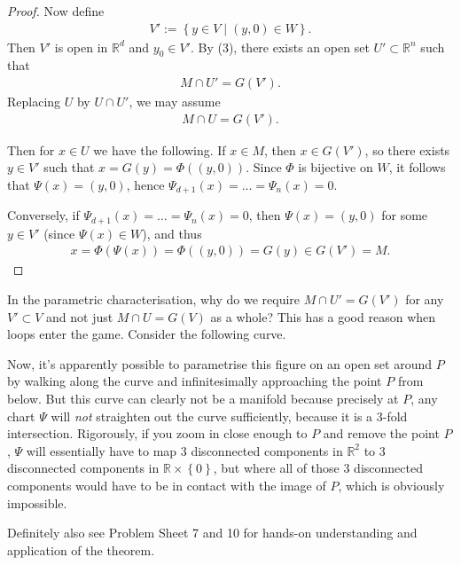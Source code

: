 \begin{proof}
	Now define
	\begin{align*}
		V' := \left\{ y \in V \mid (y,0) \in W \right\}.
	\end{align*}
	Then $V'$ is open in $\mathbb{R}^{d}$ and $y_{0} \in V'$. By (3), there exists an open set $U' \subset \mathbb{R}^{n}$ such that
	\begin{align*}
		M \cap U' = G(V').
	\end{align*}
	Replacing $U$ by $U \cap U'$, we may assume
	\begin{align*}
		M \cap U = G(V').
	\end{align*}

	Then for $x \in U$ we have the following. If $x \in M$, then $x \in G(V')$, so there exists $y \in V'$ such that $x = G(y) = \Phi((y,0))$. Since $\Phi$ is bijective on $W$, it follows that $\Psi(x) = (y,0)$, hence $\Psi_{d+1}(x) = \dots = \Psi_{n}(x) = 0$.

	Conversely, if $\Psi_{d+1}(x) = \dots = \Psi_{n}(x) = 0$, then $\Psi(x) = (y,0)$ for some $y \in V'$ (since $\Psi(x) \in W$), and thus
	\begin{align*}
		x = \Phi(\Psi(x)) = \Phi((y,0)) = G(y) \in G(V') = M.
	\end{align*}
\end{proof}


\begin{remark}
	In the parametric characterisation, why do we require $M \cap U' = G(V')$ for any $V' \subset V$ and not just $M \cap U = G(V)$ as a whole? This has a good reason when loops enter the game. Consider the following curve.
	\begin{center}
		\centering
		\def\svgwidth{0.3\linewidth}
		
	\end{center}
	Now, it's apparently possible to parametrise this figure on an open set around $P$ by walking along the curve and infinitesimally approaching the point $P$ from below. But this curve can clearly not be a manifold because precisely at $P$, any chart $\Psi$ will \textit{not} straighten out the curve sufficiently, because it is a $3$-fold intersection. Rigorously, if you zoom in close enough to $P$ and remove the point $P$, $\Psi$ will essentially have to map $3$ disconnected components in $\mathbb{R}^{2}$ to $3$ disconnected components in $\mathbb{R} \times \left\{ 0 \right\}$, but where all of those $3$ disconnected components would have to be in contact with the image of $P$, which is obviously impossible.

	Definitely also see Problem Sheet 7 and 10 for hands-on understanding and application of the theorem.
\end{remark}

